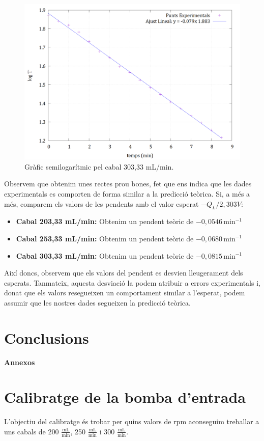 \documentclass[10pt, twoside]{article}
\begin{document}
\begin{figure}[H]
    \centering
    \includegraphics[width=0.7\linewidth]{ajustsemilog303.png}
    \caption{Gràfic semilogarítmic pel cabal 303,33 mL/min.}
    \label{fig4}
\end{figure}

Observem que obtenim unes rectes prou bones, fet que ens indica que les dades experimentals es comporten de forma similar a la predicció teòrica. Si, a més a més, comparem els valors de les pendents amb el valor esperat ${-Q_L}/{2,303V}$:

\begin{itemize}
    \item \textbf{Cabal 203,33 mL/min:} Obtenim un pendent teòric de \( -0,0546 \, \text{min}^{-1} \)
    \item \textbf{Cabal 253,33 mL/min:} Obtenim un pendent teòric de \( -0,0680 \, \text{min}^{-1} \)
    \item \textbf{Cabal 303,33 mL/min:} Obtenim un pendent teòric de \( -0,0815 \, \text{min}^{-1} \)
\end{itemize}

Així doncs, observem que els valors del pendent es desvien lleugerament dels esperats. Tanmateix, aquesta desviació la podem atribuir a errors experimentals i, donat que els valors resegueixen un comportament similar a l'esperat, podem assumir que les nostres dades segueixen la predicció teòrica.

\section{Conclusions}



\newpage
\appendix
{\Huge \textbf{Annexos}}

\section{Calibratge de la bomba d'entrada}
L'objectiu del calibratge és trobar per quins valors de rpm aconseguim treballar a uns cabals de 200 $\frac{\text{mL}}{\text{min}}$, 250 $\frac{\text{mL}}{\text{min}}$ i 300 $\frac{\text{mL}}{\text{min}}$. 
\end{document}
